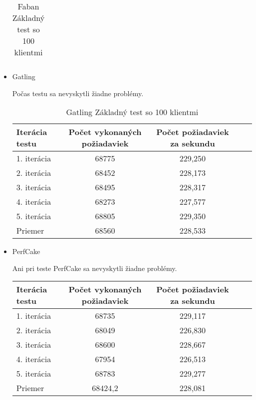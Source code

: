 \documentclass[12pt,oneside,final]{fithesis-utf8}
\begin{document}
\begin{itemize}
\begin{table}[H]
\begin{center}
\begin{tabular}{ | l | c | c | c | c |}
\end{tabular}
\end{center}
\caption{Faban Základný test so 100 klientmi}
\end{table}


\item Gatling

Počas testu sa nevyskytli žiadne problémy.

\begin{table}[H]
\begin{center}
\begin{tabular}{ | l | c | c | c | c |}
		\hline
		 \textbf{Iterácia testu} & \textbf{Počet vykonaných požiadaviek} & \textbf{Počet požiadaviek za sekundu} \\ \hline
		 1. iterácia & 68775 & 229,250 \\ \hline
		 2. iterácia & 68452 & 228,173 \\ \hline
		 3. iterácia & 68495 & 228,317 \\ \hline
		 4. iterácia & 68273 & 227,577 \\ \hline
		 5. iterácia & 68805 & 229,350 \\ \hline
		 Priemer & 68560 & 228,533 \\ \hline
		 
\end{tabular}
\end{center}
\caption{Gatling Základný test so 100 klientmi}
\end{table}


\item PerfCake

Ani pri teste PerfCake sa nevyskytli žiadne problémy.

\begin{table}[H]
\begin{center}
\begin{tabular}{ | l | c | c | c | c |}
		\hline
		 \textbf{Iterácia testu} & \textbf{Počet vykonaných požiadaviek} & \textbf{Počet požiadaviek za sekundu} \\ \hline
		 1. iterácia & 68735 & 229,117 \\ \hline
		 2. iterácia & 68049 & 226,830 \\ \hline
		 3. iterácia & 68600 & 228,667 \\ \hline
		 4. iterácia & 67954 & 226,513 \\ \hline
		 5. iterácia & 68783 & 229,277 \\ \hline
		 Priemer & 68424,2 & 228,081 \\ \hline
		 

\end{tabular}
\end{center}
\end{table}
\end{itemize}
\end{document}

